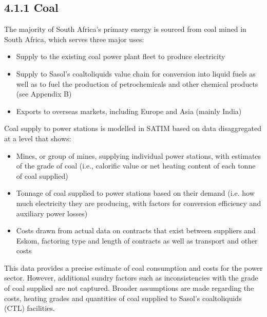 \documentclass[letterpaper,10pt,english]{jupyterBook}
\begin{document}
\sphinxAtStartPar
{}


\subsection{4.1.1 Coal}
\label{\detokenize{04EnergySupply:coal}}
\sphinxAtStartPar
The majority of South Africa’s primary energy is sourced from coal mined in South Africa, which serves three major uses:
\begin{itemize}
\item {} 
\sphinxAtStartPar
Supply to the existing coal power plant fleet to produce electricity

\item {} 
\sphinxAtStartPar
Supply to Sasol’s coal\sphinxhyphen{}to\sphinxhyphen{}liquids value chain for conversion into liquid fuels as well as to fuel the production of petrochemicals and other chemical products (see Appendix B)

\item {} 
\sphinxAtStartPar
Exports to overseas markets, including Europe and Asia (mainly India)

\end{itemize}

\sphinxAtStartPar
Coal supply to power stations is modelled in SATIM based on data disaggregated at a level that shows:
\begin{itemize}
\item {} 
\sphinxAtStartPar
Mines, or group of mines, supplying individual power stations, with estimates of the grade of coal (i.e., calorific value or net heating content of each tonne of coal supplied)

\item {} 
\sphinxAtStartPar
Tonnage of coal supplied to power stations based on their demand (i.e. how much electricity they are producing, with factors for conversion efficiency and auxiliary power losses)

\item {} 
\sphinxAtStartPar
Costs drawn from actual data on contracts that exist between suppliers and Eskom, factoring type and length of contracts as well as transport and other costs

\end{itemize}

\sphinxAtStartPar
This data provides a precise estimate of coal consumption and costs for the power sector. However, additional sundry factors such as inconsistencies with the grade of coal supplied are not captured. Broader assumptions are made regarding the costs, heating grades and quantities of coal supplied to Sasol’s coal\sphinxhyphen{}to\sphinxhyphen{}liquids (CTL) facilities.
\end{document}
